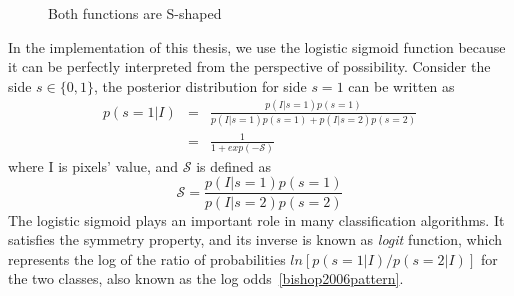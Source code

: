\begin{figure} 
  \begin{minipage}[t]{0.5\linewidth} 
    \centering 
  \end{minipage}%
  \begin{minipage}[t]{0.5\linewidth} 
    \centering 
  \end{minipage} 
\caption[Logistic sigmoid function and error function]{Both functions
  are S-shaped}
\label{fig:s-shaped}
\end{figure}

In the implementation of this thesis, we use the logistic sigmoid
function because it can be perfectly interpreted from the perspective
of possibility. Consider the side $s \in \{0,1\}$, the posterior
distribution for side $s = 1$ can be written as
\begin{eqnarray}
  \label{eq:pdfs}
  p(s=1|I) &=& \frac{p(I|s=1)p(s=1)}{p(I|s=1)p(s=1)
    + p(I|s=2)p(s=2)}\\
&=&  \frac{1}{1+exp(-\mathcal{S})}
\end{eqnarray}
where I is pixels' value, and $\mathcal{S}$ is defined as
\begin{equation}
  \label{eq:ratio}
  \mathcal{S} = \frac{p(I|s=1)p(s=1)}{p(I|s=2)p(s=2)}
\end{equation}
The logistic sigmoid plays an important role in many classification
algorithms. It satisfies the symmetry property, and its inverse 
is known as \textit{logit} function, which represents the log of the
ratio of probabilities $ln [p(s=1|I)/p(s=2|I)]$ for the two classes,
also known as the log odds~\ref{bishop2006pattern}.

